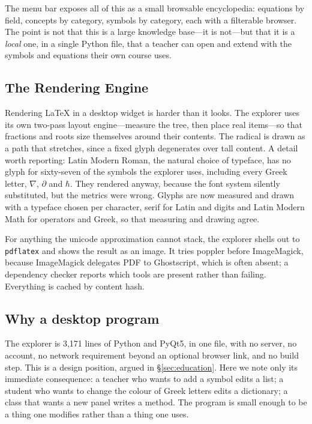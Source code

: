 \documentclass[11pt]{article}
\begin{document}
The menu bar exposes all of this as a small browsable encyclopedia: equations
by field, concepts by category, symbols by category, each with a filterable
browser. The point is not that this is a large knowledge base---it is
not---but that it is a \emph{local} one, in a single Python file, that a
teacher can open and extend with the symbols and equations their own course
uses.

\subsection{The Rendering Engine}

Rendering \LaTeX{} in a desktop widget is harder than it looks. The explorer
uses its own two-pass layout engine---measure the tree, then place real
items---so that fractions and roots size themselves around their contents. The
radical is drawn as a path that stretches, since a fixed glyph degenerates over
tall content. A detail worth reporting: Latin Modern Roman, the natural choice
of typeface, has no glyph for sixty-seven of the symbols the explorer uses,
including every Greek letter, $\nabla$, $\partial$ and $\hbar$. They rendered
anyway, because the font system silently substituted, but the metrics were
wrong. Glyphs are now measured and drawn with a typeface chosen per character,
serif for Latin and digits and Latin Modern Math for operators and Greek, so
that measuring and drawing agree.

For anything the unicode approximation cannot stack, the explorer shells out
to \texttt{pdflatex} and shows the result as an image. It tries poppler before
ImageMagick, because ImageMagick delegates PDF to Ghostscript, which is often
absent; a dependency checker reports which tools are present rather than
failing. Everything is cached by content hash.

\subsection{Why a desktop program}

The explorer is 3,171 lines of Python and PyQt5, in one file, with no server,
no account, no network requirement beyond an optional browser link, and no
build step. This is a design position, argued in \S\ref{sec:education}. Here we
note only its immediate consequence: a teacher who wants to add a symbol edits a
list; a student who wants to change the colour of Greek letters edits a
dictionary; a class that wants a new panel writes a method. The program is
small enough to be a thing one modifies rather than a thing one uses.
\end{document}
